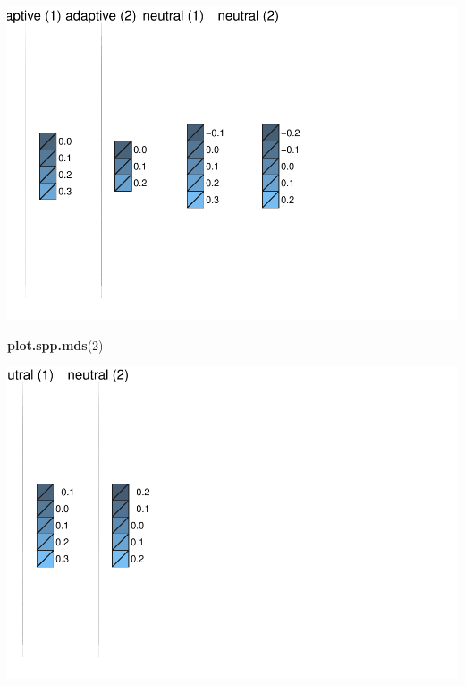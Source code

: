 \documentclass[11pt,]{article}
\newenvironment{Shaded}{\begin{snugshade}}{\end{snugshade}}
\newcommand{\KeywordTok}[1]{\textcolor[rgb]{0.13,0.29,0.53}{\textbf{{#1}}}}
\newcommand{\DecValTok}[1]{\textcolor[rgb]{0.00,0.00,0.81}{{#1}}}
\newcommand{\NormalTok}[1]{{#1}}
\let\origfigure\figure
\let\endorigfigure\endfigure
\renewenvironment{figure}[1][2] {
	\expandafter\origfigure\expandafter[H]
} {
	\endorigfigure
}
\begin{document}
\begin{figure}[htbp]
\centering
\includegraphics{article_files/figure-latex/unnamed-chunk-12-1.pdf}
\caption{Distribution of adaptive and neutral genetic variation in
\textit{Androsace obtusifolia}. Each square represents a planning unit.
The color of each planning unit panel corresponds to ordination values.
Planning units with similar colors contain individiduals with similar
genetic variation.}
\end{figure}

\begin{Shaded}
\begin{Highlighting}[]
\KeywordTok{plot.spp.mds}\NormalTok{(}\DecValTok{2}\NormalTok{)}
\end{Highlighting}
\end{Shaded}

\begin{figure}[htbp]
\centering
\includegraphics{article_files/figure-latex/unnamed-chunk-13-1.pdf}
\caption{Distribution of adaptive and neutral genetic variation in
\textit{Arabis alpina}. See Figure XX caption for conventions.}
\end{figure}
\end{document}
